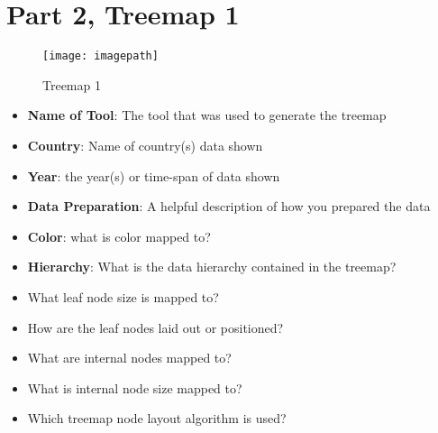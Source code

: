 \hypertarget{part-2-treemap-1}{%
\section{Part 2, Treemap 1}\label{part-2-treemap-1}}

\begin{figure}
\centering
\texttt{[image: imagepath]}
\caption{Treemap 1}
\end{figure}

\begin{itemize}
\tightlist
\item
  \textbf{Name of Tool}: The tool that was used to generate the treemap
\item
  \textbf{Country}: Name of country(s) data shown
\item
  \textbf{Year}: the year(s) or time-span of data shown
\item
  \textbf{Data Preparation}: A helpful description of how you prepared
  the data
\item
  \textbf{Color}: what is color mapped to?
\item
  \textbf{Hierarchy}: What is the data hierarchy contained in the
  treemap?
\item
  What leaf node size is mapped to?
\item
  How are the leaf nodes laid out or positioned?
\item
  What are internal nodes mapped to?
\item
  What is internal node size mapped to?
\item
  Which treemap node layout algorithm is used?
\end{itemize}
